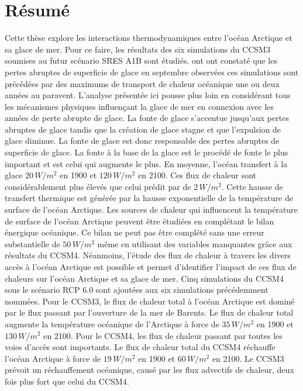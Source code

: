 \section*{Résumé}

Cette thèse explore les interactions thermodynamiques entre l'océan Arctique et sa glace de mer. Pour ce faire, les résultats des six simulations du CCSM3 soumises au futur scénario SRES A1B sont étudiés. \cite{ISI:000242942100008} ont ont constaté que les pertes abruptes de superficie de glace en septembre observées ces simulations sont précédées par des maximums de transport de chaleur océanique une ou deux années au paravent. L'analyse présentée ici pousse plus loin en considérant tous les mécanismes physiques influençant la glace de mer en connexion avec les années de perte abrupte de glace. La fonte de glace s'accentue jusqu'aux pertes abruptes de glace tandis que la création de glace stagne et que l'expulsion de glace diminue. La fonte de glace est donc responsable des pertes abruptes de superficie de glace. La fonte à la base de la glace est le procédé de fonte le plus important et est celui qui augmente le plus. En moyenne, l'océan transfert à la glace $20\,W/m^2$ en 1900 et $120\,W/m^2$ en 2100. Ces flux de chaleur sont considérablement plus élevés que celui prédit par \cite{ISI:A1971I688400007} de $2\,W/m^2$. Cette hausse de transfert thermique est générée par la  hausse exponentielle de la température de surface de l'océan Arctique. Les sources de chaleur qui influencent la température de surface de l'océan Arctique peuvent être étudiées en complétant le bilan énergique océanique. Ce bilan ne peut pas être complété sans une erreur substantielle de $50\,W/m^2$ même en utilisant des variables manquantes grâce aux résultats du CCSM4. Néanmoins, l'étude des flux de chaleur à travers les divers accès à l'océan Arctique est possible et permet d'identifier l'impact de ces flux de chaleurs sur l'océan Arctique et sa glace de mer. Cinq simulations du CCSM4 sous le scénario RCP 6.0 sont ajoutées aux six simulations précédemment nommées. Pour le CCSM3, le flux de chaleur total à l'océan Arctique est dominé par le flux passant par l'ouverture de la mer de Barents. Le flux de chaleur total augmente la température océanique de l'Arctique à force de $35\,W/m^2$ en 1900 et $130\,W/m^2$ en 2100. Pour le CCSM4, les flux de chaleur passant par toutes les voies d'accès sont importants. Le flux de chaleur total du CCSM4 réchauffe l'océan Arctique à force de $19\,W/m^2$ en 1900 et $60\,W/m^2$ en 2100. Le CCSM3 prévoit un réchauffement océanique, causé par les flux advectifs de chaleur, deux fois plus fort que celui du CCSM4. 








